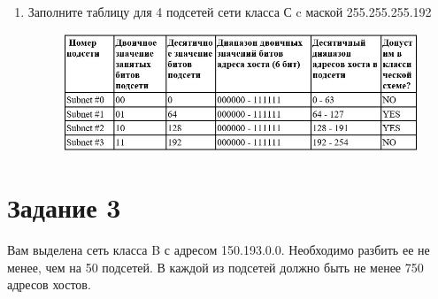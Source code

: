 \documentclass[bachelor, och, labwork]{shiza}
\begin{document}
\begin{enumerate}
    
    \item Заполните таблицу для 4 подсетей сети класса С c маской 255.255.255.192
    
    \begin{figure}[H]
        \centering      %
        \includegraphics[width=1\textwidth]{3}
        \label{fig:image1}
    \end{figure}

\end{enumerate}

\section{Задание 3}

Вам выделена сеть класса B с адресом 150.193.0.0. Необходимо разбить ее не менее, чем на 50 подсетей. В каждой из подсетей должно быть не менее 750 адресов хостов.
\end{document}
